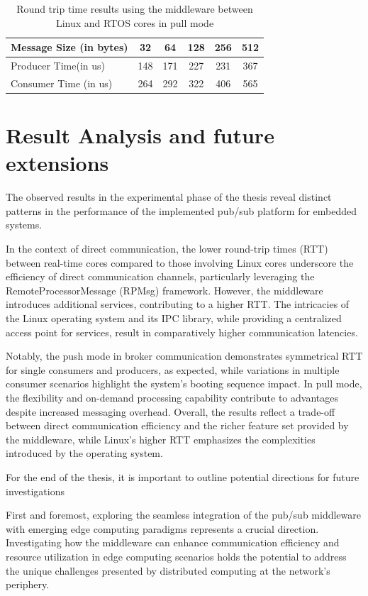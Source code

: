 \begin{table}[H]
\centering
\caption{Round trip time results using the middleware between Linux and RTOS
    cores in pull mode}
\label{table:broker_communication_linux_RTOS_cores_pull}
\begin{tabular}{lccccc}
\toprule
Message Size (in bytes) & 32 & 64 & 128 & 256 & 512 \\
\midrule
Producer Time(in us) & 148 & 171 & 227 & 231 & 367 \\
Consumer Time (in us) & 264 & 292 & 322 & 406 & 565 \\
\bottomrule
\end{tabular}
\end{table}

\section{Result Analysis and future extensions}

The observed results in the experimental phase of the thesis reveal distinct patterns in the performance of the implemented pub/sub platform for embedded systems.

In the context of direct communication, the lower round-trip times (RTT) between real-time cores compared to those involving Linux cores underscore the efficiency of direct communication channels, particularly leveraging the RemoteProcessorMessage (RPMsg) framework. However, the middleware introduces additional services, contributing to a higher RTT. The intricacies of the Linux operating system and its IPC library, while providing a centralized access point for services, result in comparatively higher communication latencies.

Notably, the push mode in broker communication demonstrates symmetrical RTT for single consumers and producers, as expected, while variations in multiple consumer scenarios highlight the system's booting sequence impact. In pull mode, the flexibility and on-demand processing capability contribute to advantages despite increased messaging overhead. Overall, the results reflect a trade-off between direct communication efficiency and the richer feature set provided by the middleware, while Linux's higher RTT emphasizes the complexities introduced by the operating system.

For the end of the thesis, it is important to outline potential directions for
future investigations 

First and foremost, exploring the seamless integration of the pub/sub middleware with emerging edge computing paradigms represents a crucial direction. Investigating how the middleware can enhance communication efficiency and resource utilization in edge computing scenarios holds the potential to address the unique challenges presented by distributed computing at the network's periphery. 


